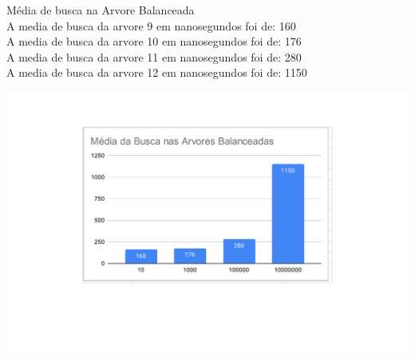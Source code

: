 \pagebreak    
Média de busca na Arvore Balanceada\\
A media de busca da arvore 9 em nanosegundos foi de: 160\\
A media de busca da arvore 10 em nanosegundos foi de: 176\\
A media de busca da arvore 11 em nanosegundos foi de: 280\\
A media de busca da arvore 12 em nanosegundos foi de: 1150
    \begin{center}
            \includegraphics[scale=0.8]{Trabalho AED/fig/grafico7.pdf}
            \label{fig:Grafico 7}
    \end{center}
\pagebreak     
